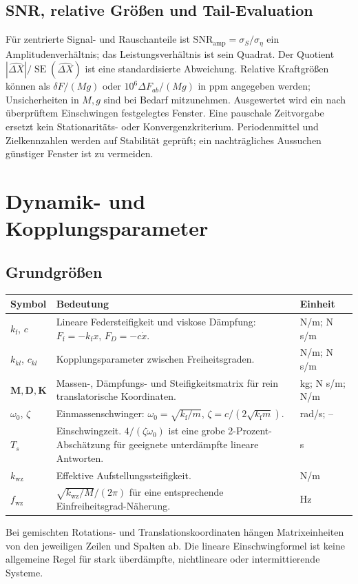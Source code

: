 \documentclass[11pt,a4paper]{article}
\makeatletter
\newcommand{\SE}{\operatorname{SE}}
\newenvironment{symtab}{\begin{longtable}{@{}L{.22\textwidth}L{.62\textwidth}L{.12\textwidth}@{}}\toprule\textbf{Symbol}&\textbf{Bedeutung}&\textbf{Einheit}\\\midrule\endhead}{\bottomrule\end{longtable}}
\makeatother
\begin{document}
\subsection{SNR, relative Größen und Tail-Evaluation}
Für zentrierte Signal- und Rauschanteile ist $\mathrm{SNR}_{\mathrm{amp}}=\sigma_S/\sigma_\eta$ ein Amplitudenverhältnis; das Leistungsverhältnis ist sein Quadrat. Der Quotient $|\widehat{\Delta X}|/\SE(\widehat{\Delta X})$ ist eine standardisierte Abweichung.
Relative Kraftgrößen können als $\delta F/(Mg)$ oder $10^6\Delta F_{ab}/(Mg)$ in ppm angegeben werden; Unsicherheiten in $M,g$ sind bei Bedarf mitzunehmen.
Ausgewertet wird ein nach überprüftem Einschwingen festgelegtes Fenster. Eine pauschale Zeitvorgabe ersetzt kein Stationaritäts- oder Konvergenzkriterium. Periodenmittel und Zielkennzahlen werden auf Stabilität geprüft; ein nachträgliches Aussuchen günstiger Fenster ist zu vermeiden.

\section{Dynamik- und Kopplungsparameter}\label{sec:dynamik}
\subsection{Grundgrößen}
\begin{symtab}
$k_{\mathrm f}$, $c$&Lineare Federsteifigkeit und viskose Dämpfung: $F_{\mathrm f}=-k_{\mathrm f}x$, $F_D=-c\dot x$.&N/m; N s/m\\
$k_{kl}$, $c_{kl}$&Kopplungsparameter zwischen Freiheitsgraden.&N/m; N s/m\\
$\mathbf M,\mathbf D,\mathbf K$&Massen-, Dämpfungs- und Steifigkeitsmatrix für rein translatorische Koordinaten.&kg; N s/m; N/m\\
$\omega_0$, $\zeta$&Einmassenschwinger: $\omega_0=\sqrt{k_{\mathrm f}/m}$, $\zeta=c/(2\sqrt{k_{\mathrm f}m})$.&rad/s; --\\
$T_s$&Einschwingzeit. $4/(\zeta\omega_0)$ ist eine grobe 2-Prozent-Abschätzung für geeignete unterdämpfte lineare Antworten.&s\\
$k_{\mathrm{wz}}$&Effektive Aufstellungssteifigkeit.&N/m\\
$f_{\mathrm{wz}}$&$\sqrt{k_{\mathrm{wz}}/M}/(2\pi)$ für eine entsprechende Einfreiheitsgrad-Näherung.&Hz\\
\end{symtab}
Bei gemischten Rotations- und Translationskoordinaten hängen Matrixeinheiten von den jeweiligen Zeilen und Spalten ab. Die lineare Einschwingformel ist keine allgemeine Regel für stark überdämpfte, nichtlineare oder intermittierende Systeme.
\end{document}
